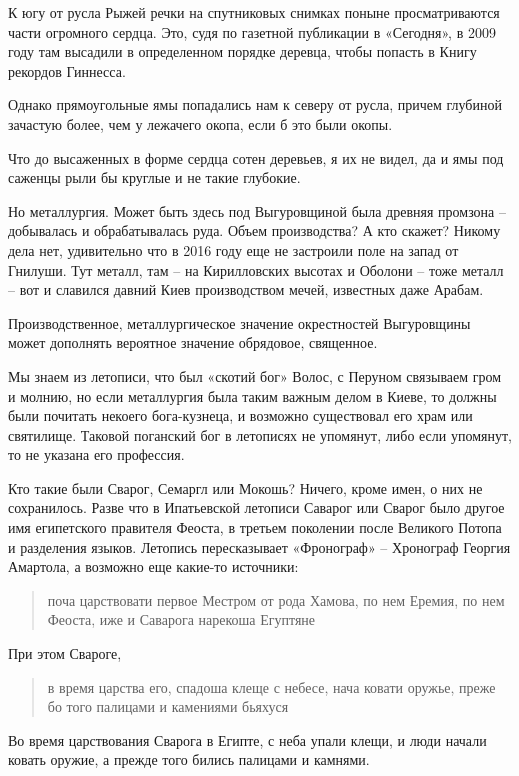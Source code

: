 К югу от русла Рыжей речки на спутниковых снимках поныне просматриваются части огромного сердца. Это, судя по газетной публикации в «Сегодня», в 2009 году там высадили в определенном порядке деревца, чтобы попасть в Книгу рекордов Гиннесса.
 
Однако прямоугольные ямы попадались нам к северу от русла, причем глубиной зачастую более, чем у лежачего окопа, если б это были окопы.

Что до высаженных в форме сердца сотен деревьев, я их не видел, да и ямы под саженцы рыли бы круглые и не такие глубокие.

Но металлургия. Может быть здесь под Выгуровщиной была древняя промзона – добывалась и обрабатывалась руда. Объем производства? А кто скажет? Никому дела нет, удивительно что в 2016 году еще не застроили поле на запад от Гнилуши. Тут металл, там – на Кирилловских высотах и Оболони – тоже металл – вот и славился давний Киев производством мечей, известных даже Арабам.

Производственное, металлургическое значение окрес\-тностей Выгуровщины может дополнять вероятное значение обрядовое, священное.

Мы знаем из летописи, что был «скотий бог» Волос, с Перуном связываем гром и молнию, но если металлургия была таким важным делом в Киеве, то должны были почитать некоего бога-кузнеца, и возможно существовал его храм или святилище. Таковой поганский бог в летописях не упомянут, либо если упомянут, то не указана его профессия.

Кто такие были Сварог, Семаргл или Мокошь? Ничего, кроме имен, о них не сохранилось. Разве что в Ипатьевской летописи Саварог или Сварог было другое имя египетского правителя Феоста, в третьем поколении после Великого Потопа и разделения языков. Летопись пересказывает «Фронограф» – Хронограф Георгия Амартола, а возможно еще какие-то источники:

\begin{quotation}
поча царствовати первое Местром от рода Хамова, по нем Еремия, по нем Феоста, иже и Саварога нарекоша Егуптяне
\end{quotation}

При этом Свароге, 

\begin{quotation}
в время царства его, спадоша клеще с небесе, нача ковати оружье, преже бо того палицами и камениями бьяхуся
\end{quotation}

Во время царствования Сварога в Египте, с неба упали клещи, и люди начали ковать оружие, а прежде того бились палицами и камнями.

